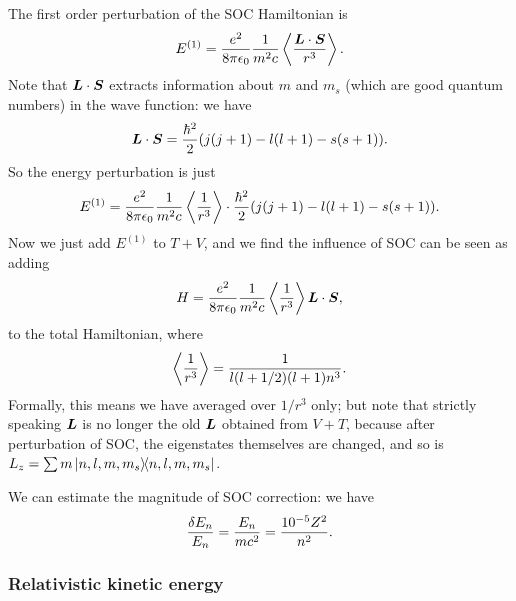 \documentclass[hyperref, a4paper]{article}
\begin{document}
The first order perturbation of the SOC Hamiltonian is 
\[
    E^{(1)} = \frac{e^2}{8 \pi \epsilon_0} \frac{1}{m^2 c} \expval{\frac{\vb*{L} \cdot \vb*{S}}{r^3}}.
\]
Note that $\vb*{L} \cdot \vb*{S}$ extracts information about $m$ and $m_s$
(which are good quantum numbers)
in the wave function:
we have 
\begin{equation}
    \vb*{L} \cdot \vb*{S} = \frac{\hbar^2}{2} (j (j + 1) - l (l + 1) - s (s + 1)).
\end{equation}
So the energy perturbation is just 
\[
    E^{(1)} = \frac{e^2}{8 \pi \epsilon_0} \frac{1}{m^2 c} \expval{\frac{1}{r^3}} \cdot 
    \frac{\hbar^2}{2} (j (j + 1) - l (l + 1) - s (s + 1)).
\]
Now we just add $E^{(1)}$ to $T + V$, 
and we find the influence of SOC can be seen as adding 
\begin{equation}
    H = \frac{e^2}{8 \pi \epsilon_0} \frac{1}{m^2 c} \expval{\frac{1}{r^3}} \vb*{L} \cdot \vb*{S},
\end{equation}
to the total Hamiltonian, where 
\begin{equation}
    \expval{\frac{1}{r^3}} = \frac{1}{l (l + 1/2) (l + 1) n^3}.
\end{equation}
Formally, this means we have averaged over $1 / r^3$ only;
but note that strictly speaking $\vb*{L}$ is no longer 
the old $\vb*{L}$ obtained from $V + T$, 
because after perturbation of SOC, 
the eigenstates themselves are changed, 
and so is $L_z = \sum m \dyad*{n, l, m, m_s}{n, l, m, m_s}$.

We can estimate the magnitude of SOC correction: 
we have 
\begin{equation}
    \frac{\var{E_n}}{E_n} = \frac{E_n}{m c^2} = \frac{10^{-5} Z^2}{n^2}.
\end{equation}

\subsubsection{Relativistic kinetic energy}
\end{document}
